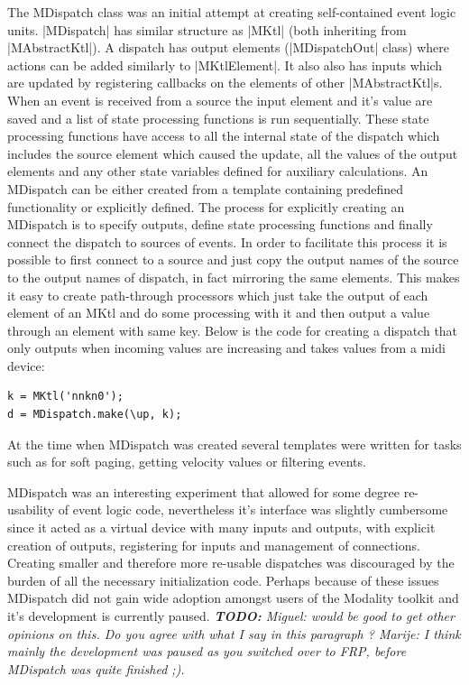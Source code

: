 \documentclass{article}
\newcommand{\todo}[1] {\emph{\textbf{TODO:} #1}}
\begin{document}
The MDispatch class was an initial attempt at creating self-contained event logic units. |MDispatch| has similar structure as |MKtl| (both inheriting from |MAbstractKtl|). A dispatch has output elements (|MDispatchOut| class) where actions can be added similarly to |MKtlElement|. It also also has inputs which are updated by registering callbacks on the elements of other |MAbstractKtl|s. When an event is received from a source the input element and it's value are saved and a list of state processing functions is run sequentially. These state processing functions have access to all the internal state of the dispatch which includes the source element which caused the update, all the values of the output elements and any other state variables defined for auxiliary calculations. An MDispatch can be either created from a template containing predefined functionality or explicitly defined. The process for explicitly creating an MDispatch is to specify outputs, define state processing functions and finally connect the dispatch to sources of events. In order to facilitate this process it is possible to first connect to a source and just copy the output names of the source to the output names of dispatch, in fact mirroring the same elements. This makes it easy to create path-through processors which just take the output of each element of an MKtl and do some processing with it and then output a value through an element with same key. Below is the code for creating a dispatch that only outputs when incoming values are increasing and takes values from a midi device:

\begin{Verbatim}
k = MKtl('nnkn0');
d = MDispatch.make(\up, k);
\end{Verbatim}

At the time when MDispatch was created several templates were written for tasks such as for soft paging, getting velocity values or filtering events. 

MDispatch was an interesting experiment that allowed for some degree re-usability of event logic code, nevertheless it's interface was slightly cumbersome since it acted as a virtual device with many inputs and outputs, with explicit creation of outputs, registering for inputs and management of connections. Creating smaller and therefore more re-usable dispatches was discouraged by the burden of all the necessary initialization code. Perhaps because of these issues MDispatch did not gain wide adoption amongst users of the Modality toolkit and it's development is currently paused.
\todo{ Miguel: would be good to get other opinions on this. Do you agree with what I say in this paragraph ? Marije: I think mainly the development was paused as you switched over to FRP, before MDispatch was quite finished ;).}
		
\end{document}
